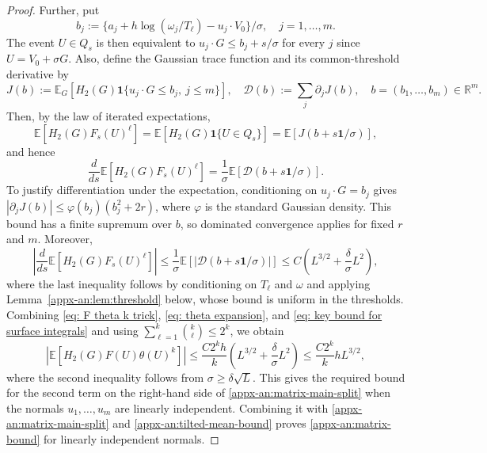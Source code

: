 \documentclass[11pt,letterpaper]{article}
\theoremstyle{remark}
\newcommand{\E}{\mathbb E}
\newcommand{\R}{\mathbb R}
\newcommand{\ind}{\mathbf 1}
\begin{document}
\begin{proof}
Further, put
\[
 b_j:=\{a_j+h\log(\omega_j/T_\ell)-u_j\cdot V_0\}/\sigma,\quad j=1,\dots,m.
\]
The event \(U\in Q_s\) is then equivalent to
\(u_j\cdot G\le b_j+s/\sigma\) for every \(j\) since $U = V_0 + \sigma G$. Also, define the
Gaussian trace function and its common-threshold derivative by
\begin{equation}
 J(b):=\E_G[H_2(G)\ind\{u_j\cdot G\le b_j,\ j\le m\}],
 \quad \mathcal D(b):=\sum_j\partial_jJ(b),\quad b=(b_1,\dots,b_m)\in\R^m.
 \label{appx-an:threshold-functions}
\end{equation}
Then, by the law of iterated expectations,
\[
 \E[H_2(G)F_s(U)^\ell] = \E[H_2(G)\ind\{U\in Q_s\}]
 =\E[J(b+s\mathbf1/\sigma)],
\]
and hence
\[
 \frac{d}{ds}\E[H_2(G)F_s(U)^\ell]
 =\frac1\sigma\E[\mathcal D(b+s\mathbf1/\sigma)].
\]
To justify differentiation under the expectation, conditioning on
$u_j\cdot G=b_j$ gives
$|\partial_jJ(b)|\le\varphi(b_j)(b_j^2+2r)$, where $\varphi$ is the
standard Gaussian density. This bound has a finite supremum over $b$,
so dominated convergence applies for fixed $r$ and $m$. Moreover,
\begin{equation}\label{eq: key bound for surface integrals}
 \left|\frac{d}{ds}\E[H_2(G)F_s(U)^\ell]\right|
 \le\frac1\sigma\E[|\mathcal D(b+s\mathbf1/\sigma)|]
 \le C\left(L^{3/2}+\frac\delta\sigma L^2\right),
\end{equation}
where the last inequality follows by conditioning on $T_\ell$ and
$\omega$ and applying Lemma~\ref{appx-an:lem:threshold} below, whose
bound is uniform in the thresholds. Combining \eqref{eq: F theta k trick}, \eqref{eq: theta expansion}, and \eqref{eq: key bound for surface integrals} and using
\(\sum_{\ell=1}^k\binom{k}{\ell}\le2^k\), we obtain
\[
 \left|\E[H_2(G)F(U)\theta(U)^k]\right|
 \le\frac{C2^kh}{k}
       \left(L^{3/2}+\frac\delta\sigma L^2\right)
 \le\frac{C2^k}{k}hL^{3/2},
\]
where the second inequality follows from \(\sigma\ge\delta\sqrt L\).
This gives the required bound for the second term on the right-hand side of \eqref{appx-an:matrix-main-split} when the normals $u_1,\dots, u_m$ are linearly independent. Combining it with \eqref{appx-an:matrix-main-split} and
\eqref{appx-an:tilted-mean-bound} proves
\eqref{appx-an:matrix-bound} for linearly independent normals.




\end{proof}
\end{document}
